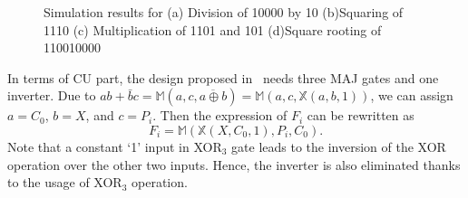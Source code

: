 \documentclass[9pt,journal,compsoc]{IEEEtran}
\begin{document}
\begin{figure}[h]
    \centering
    \caption{Simulation results for (a) Division of 10000 by 10 (b)Squaring of 1110 (c) Multiplication of 1101 and 101 (d)Square rooting of 110010000 }\label{tt_array}
\end{figure}



In terms of CU part, the design proposed in~\cite{2} needs three MAJ gates and one inverter. Due to $ab + \bar b c = \mathbb{M}(a, c, \overline{a \oplus b}) = \mathbb{M}(a, c, \mathbb{X}(a,b,1))$, we can assign $a = C_0$, $b = X$, and $c = P_i$. Then the expression of $F_i$ can be rewritten as
\begin{equation}\label{Fi_xmg}
F_{i} = \mathbb{M}(\mathbb{X}(X,C_{0},1),P_{i},C_{0}).
\end{equation}
Note that a constant `1' input in XOR$_3$ gate leads to the inversion of the XOR operation over the other two inputs. Hence, the inverter is also eliminated thanks to the usage of XOR$_3$ operation.
\end{document}
